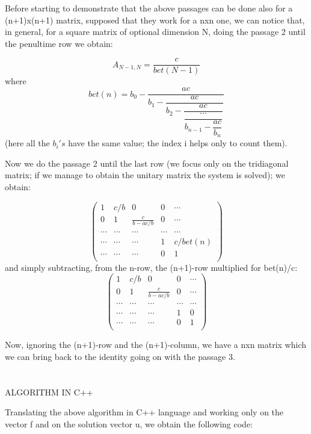 \documentclass {article}
\begin{document}
Before starting to demonstrate that the above passages can be done also for a (n+1)x(n+1) matrix, supposed that they work for a nxn one, we can notice that, in general, for a square matrix of optional dimension N, doing the passage 2 until the penultime row we obtain:

$$A_{N-1,N}=\frac{c}{bet(N-1)}$$
where 
$$bet(n)=b_0-\dfrac{ac}{b_1-\dfrac{ac}{b_2-\dfrac{ac}{\dfrac{\cdots}{b_{n-1}-\dfrac{ac}{b_n}}}}}$$
(here all the $b_i's$ have the same value; the index i helps only to count them).

Now we do the passage 2 until the last row (we focus only on the tridiagonal matrix; if we manage to obtain the unitary matrix the system is solved); we obtain:

\begin{equation}
\left(
\begin{array}{ccccc}
  1 & c/b & 0 & 0 & \cdots \\
  0 & 1 & \frac{c}{b-ac/b} & 0 & \cdots \\
  \cdots & \cdots & \cdots & \cdots & \cdots \\
  \cdots & \cdots & \cdots & 1 & c/bet(n) \\
  \cdots & \cdots & \cdots & 0 & 1 \\
\end{array}
\right)
\end{equation}
and simply subtracting, from the n-row, the (n+1)-row multiplied for bet(n)/c:
\begin{equation}
\left(
\begin{array}{ccccc}
  1 & c/b & 0 & 0 & \cdots \\
  0 & 1 & \frac{c}{b-ac/b} & 0 & \cdots \\
  \cdots & \cdots & \cdots & \cdots & \cdots \\
  \cdots & \cdots & \cdots & 1 & 0 \\
  \cdots & \cdots & \cdots & 0 & 1 \\
\end{array}
\right)
\end{equation}

Now, ignoring the (n+1)-row and the (n+1)-column, we have a nxn matrix which we can bring back to the identity going on with the passage 3.
\\
\\
\\
ALGORITHM IN C++

Translating the above algorithm in C++ language and working only on the vector f and on the solution vector u, we obtain the following code:
\end{document}
